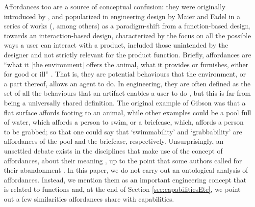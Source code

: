 \documentclass[sw]{iosart2x}
\newcommand{\quotes}[1]{`#1'}
\newcommand{\qquotes}[1]{``#1''}
\newcommand{\TODO}[1]{{%
}}
\newcommand{\TODOinline}[1]{{%
}}
\newcommand{\myComment}[1]{{\unskip \ignorespaces}}
\begin{document}
Affordances too are a source of conceptual confusion:
they were originally introduced by \cite{gibsonTheoryAffordances1979}, and popularized in engineering design by Maier and Fadel in a series of works (\cite{maier2001affordance,maierAffordanceBasedDesign2009}, among others) as a paradigm-shift from a function-based design, towards an interaction-based design, characterized by the focus on all the possible ways a user can interact with a product, included those unintended by the designer and not strictly relevant for the product function.
Briefly, affordances are \qquotes{what it [the environment] offers the animal, what it provides or furnishes, either for good or ill} \cite{gibsonTheoryAffordances1979}. That is, they are potential behaviours that the environment, or a part thereof, allows an agent to do. 
In engineering, they are often defined as the set of all the behaviours that an artifact enables a user to do \cite{brownRelationshipFunctionAffordance2005}, but this is far from being a universally shared definition.\myComment{\qquotes{interaction between artifact and user in which properties of the artifact offer a potential use to the user} \cite{maierAffordanceBasedDesign2009}}
The original example of Gibson was that a flat surface affords footing to an animal, while other examples could be a pool full of water, which affords a person to swim, or a briefcase, which, affords a person to be grabbed; so that one could say that \quotes{swimmability} and \quotes{grabbability} are affordances of the pool and the briefcase, respectively.
Unsurprisingly, an unsettled debate exists in the disciplines that make use of the concept of affordances, about their meaning \cite{brownRelationshipFunctionAffordance2005}, up to the point that some authors called for their abandonment \cite{motaDispensingTheoryPhilosophy2021}.
In this paper, we do not carry out an ontological analysis of affordances. 
Instead, we mention them as an important engineering concept that is related to functions \cite{brownRelationshipFunctionAffordance2005} and, at the end of Section \ref{sec:capabilitiesEtc}, we point out a few similarities affordances share with capabilities.



\end{document}

